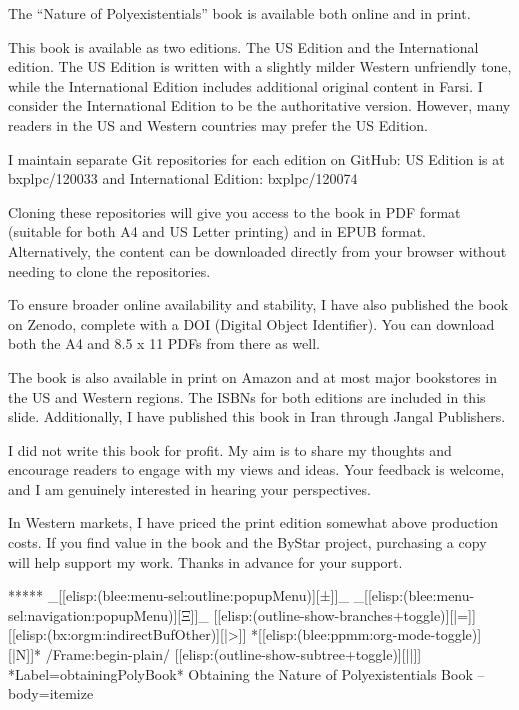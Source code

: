 \begin{whenOrg}
\begin{frame}[fragile,plain,label=obtainingPolyBookInsert]
{  The ``Nature of Polyexistentials'' book is available both online and in print.

  This book is available as two editions. The US Edition and the International edition. The
  US Edition is written with a slightly milder Western unfriendly tone, while the International Edition
  includes additional original content in Farsi. I consider the International Edition to
  be the authoritative version. However, many readers in the US and Western countries may
  prefer the US Edition.

  I maintain separate Git repositories for each edition on GitHub:
  US Edition is at bxplpc/120033 and International Edition: bxplpc/120074

  Cloning these repositories will give you access to the book in PDF format (suitable for
  both A4 and US Letter printing) and in EPUB format. Alternatively, the content can be
  downloaded directly from your browser without needing to clone the repositories.

  To ensure broader online availability and stability, I have also published the book on
  Zenodo, complete with a DOI (Digital Object Identifier). You can download both the A4 and
  8.5 x 11 PDFs from there as well.

  The book is also available in print on Amazon and at most major bookstores in the US and
  Western regions. The ISBNs for both editions are included in this slide.
  Additionally, I have published this book in Iran through Jangal Publishers.

  I did not write this book for profit. My aim is to share my thoughts and encourage
  readers to engage with my views and ideas. Your feedback is welcome, and I am genuinely
  interested in hearing your perspectives.

  In Western markets, I have priced the print edition somewhat above production costs. If
  you find value in the book and the ByStar project, purchasing a copy will help support
  my work. Thanks in advance for your support.

}
\end{frame}



\begin{whenOrg}
*****  _[[elisp:(blee:menu-sel:outline:popupMenu)][±]]_ _[[elisp:(blee:menu-sel:navigation:popupMenu)][Ξ]]_ [[elisp:(outline-show-branches+toggle)][|=]] [[elisp:(bx:orgm:indirectBufOther)][|>]] *[[elisp:(blee:ppmm:org-mode-toggle)][|N]]*  /Frame:begin-plain/ [[elisp:(outline-show-subtree+toggle)][||]] *Label=obtainingPolyBook* Obtaining the Nature of Polyexistentials Book -- body=itemize
\end{whenOrg}


\end{whenOrg}
